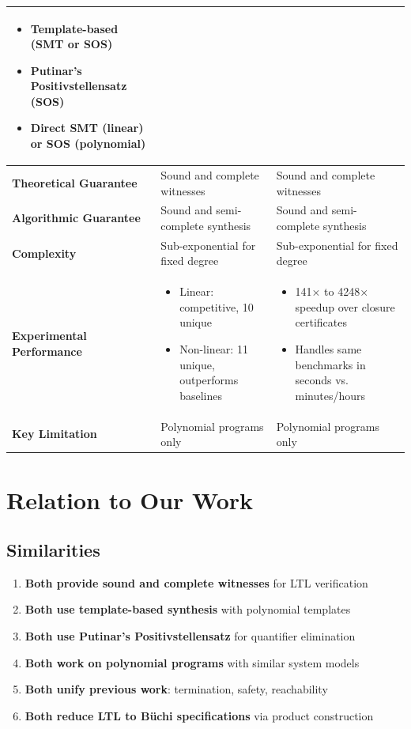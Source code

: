 \documentclass{article}
\begin{document}
\begin{enumerate}
\begin{center}
\begin{tabular}{|p{3.5cm}|p{5.5cm}|p{5.5cm}|}
\begin{itemize}
\item Template-based (SMT or SOS)
\item Putinar's Positivstellensatz (SOS)
\item Direct SMT (linear) or SOS (polynomial)
\end{itemize} \\
\hline
\textbf{Theoretical Guarantee} & Sound and complete witnesses & Sound and complete witnesses \\
\hline
\textbf{Algorithmic Guarantee} & Sound and semi-complete synthesis & Sound and semi-complete synthesis \\
\hline
\textbf{Complexity} & Sub-exponential for fixed degree & Sub-exponential for fixed degree \\
\hline
\textbf{Experimental Performance} &
\begin{itemize}
\item Linear: competitive, 10 unique
\item Non-linear: 11 unique, outperforms baselines
\end{itemize} &
\begin{itemize}
\item 141× to 4248× speedup over closure certificates
\item Handles same benchmarks in seconds vs. minutes/hours
\end{itemize} \\
\hline
\textbf{Key Limitation} & Polynomial programs only & Polynomial programs only \\
\hline
\end{tabular}
\end{center}

\section{Relation to Our Work}

\subsection{Similarities}

\begin{enumerate}
    \item \textbf{Both provide sound and complete witnesses} for LTL verification
    \item \textbf{Both use template-based synthesis} with polynomial templates
    \item \textbf{Both use Putinar's Positivstellensatz} for quantifier elimination
    \item \textbf{Both work on polynomial programs} with similar system models
    \item \textbf{Both unify previous work}: termination, safety, reachability
    \item \textbf{Both reduce LTL to Büchi specifications} via product construction
\end{enumerate}


\end{enumerate}
\end{document}
